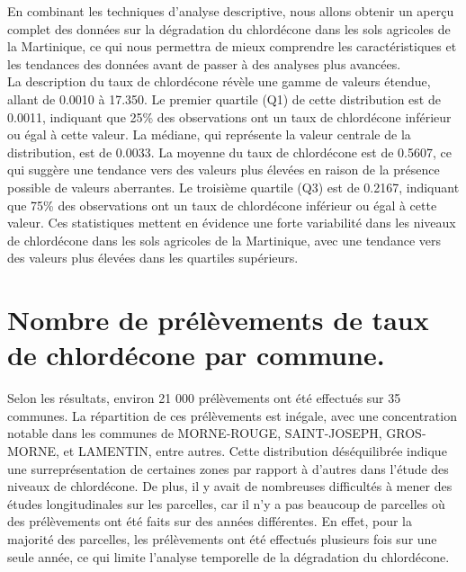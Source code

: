 \documentclass{report}
\begin{document}
En combinant les techniques d'analyse descriptive, nous allons obtenir un aperçu complet des données sur la dégradation du chlordécone dans les sols agricoles de la Martinique, ce qui nous permettra de mieux comprendre les caractéristiques et les tendances des données avant de passer à des analyses plus avancées.\\

La description du taux de chlordécone révèle une gamme de valeurs étendue, allant de 0.0010 à 17.350. Le premier quartile (Q1) de cette distribution est de 0.0011, indiquant que 25\% des observations ont un taux de chlordécone inférieur ou égal à cette valeur. La médiane, qui représente la valeur centrale de la distribution, est de 0.0033. La moyenne du taux de chlordécone est de 0.5607, ce qui suggère une tendance vers des valeurs plus élevées en raison de la présence possible de valeurs aberrantes. Le troisième quartile (Q3) est de 0.2167, indiquant que 75\% des observations ont un taux de chlordécone inférieur ou égal à cette valeur. Ces statistiques mettent en évidence une forte variabilité dans les niveaux de chlordécone dans les sols agricoles de la Martinique, avec une tendance vers des valeurs plus élevées dans les quartiles supérieurs.\\


\section*{Nombre de prélèvements de taux de chlordécone par commune.}


Selon les résultats, environ 21 000 prélèvements ont été effectués sur 35 communes. La répartition de ces prélèvements est inégale, avec une concentration notable dans les communes de MORNE-ROUGE, SAINT-JOSEPH, GROS-MORNE, et LAMENTIN, entre autres. Cette distribution déséquilibrée indique une surreprésentation de certaines zones par rapport à d'autres dans l'étude des niveaux de chlordécone. De plus, il y avait de nombreuses difficultés à mener des études longitudinales sur les parcelles, car il n'y a pas beaucoup de parcelles où des prélèvements ont été faits sur des années différentes. En effet, pour la majorité des parcelles, les prélèvements ont été effectués plusieurs fois sur une seule année, ce qui limite l'analyse temporelle de la dégradation du chlordécone.
\end{document}

